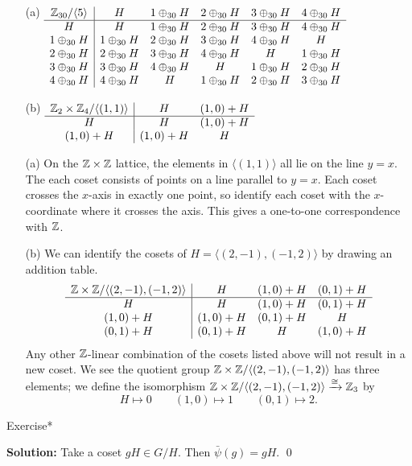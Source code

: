 \documentclass[../algebraNotesMSRI-UP2016.tex]{subfiles}
\begin{document}
\begin{frame}
\begin{itemize}
\item[(a)] $
\begin{array}[t]{c | c c c c c }
 \mathbb Z_{30}/\langle 5\rangle  & H & 1\oplus_{30}H & 2\oplus_{30} H & 3\oplus_{30}H & 4\oplus_{30}H \\
 \hline
 H & H & 1\oplus_{30}H & 2\oplus_{30}H & 3\oplus_{30}H & 4\oplus_{30}H \\ 
 1\oplus_{30}H & 1\oplus_{30}H & 2\oplus_{30}H & 3\oplus_{30}H & 4\oplus_{30}H & H \\
 2\oplus_{30}H & 2\oplus_{30}H & 3\oplus_{30}H & 4\oplus_{30}H & H &1\oplus_{30}H \\
 3\oplus_{30}H & 3\oplus_{30}H & 4\oplus_{30}H & H & 1\oplus_{30}H & 2\oplus_{30}H \\
 4\oplus_{30}H & 4\oplus_{30}H & H & 1\oplus_{30}H & 2\oplus_{30}H & 3\oplus_{30}H 
\end{array}
$

\smallGap
\item[(b)]$
\begin{array}[t]{ c | c c }
\mathbb Z_2\times \mathbb Z_4/\langle (1,1)\rangle & H & (1,0)+H \\
\hline
H & H & (1,0)+H \\
(1,0)+H & (1,0)+H & H
\end{array}
$
\end{itemize}
\end{frame}

\begin{frame}
\begin{itemize}
\item[(a)] On the $\mathbb Z\times \mathbb Z$ lattice, the elements in $\langle (1,1)\rangle$ all lie on the line $y=x$.  The each coset consists of points on a line parallel to $y=x$.  Each coset crosses the $x$-axis in exactly one point, so identify each coset with the $x$-coordinate where it crosses the axis.  This gives a one-to-one correspondence with $\mathbb Z$.

\smallGap
\item[(b)] We can identify the cosets of $H=\langle (2,-1),(-1,2)\rangle$ by drawing an addition table.
\[
\begin{array}{ c | c c c }
\mathbb Z\times \mathbb Z/\langle (2,-1),(-1,2)\rangle & H & (1,0)+H & (0,1)+H \\
\hline
H & H & (1,0)+H & (0,1)+H \\
(1,0)+H & (1,0)+H & (0,1)+H & H \\
(0,1)+H & (0,1)+H & H & (1,0)+H
\end{array}
\]
Any other $\mathbb Z$-linear combination of the cosets listed above will not result in a new coset.  We see the quotient group $\mathbb Z\times \mathbb Z/\langle (2,-1),(-1,2)\rangle$ has three elements; we define the isomorphism $\mathbb Z\times\mathbb Z/\langle (2,-1),(-1,2)\rangle\xrightarrow{\cong} \mathbb Z_3$ by 
\[
H \mapsto 0 \qquad
(1,0) \mapsto 1 \qquad 
(0,1) \mapsto 2.
\]
\end{itemize}
\end{frame}

\begin{frame}
\begin{block}{Exercise*}\end{block}
\vspace{-0.75pc}
\textbf{Solution:} Take a coset $gH\in G/H$.  Then $\bar{\psi}(g)=gH$.
\qed
\end{frame}

\end{document}
